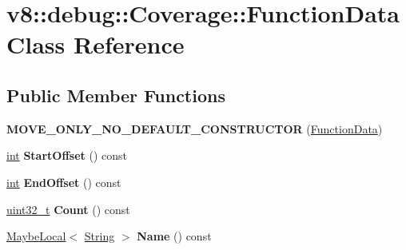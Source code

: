 \hypertarget{classv8_1_1debug_1_1Coverage_1_1FunctionData}{}\section{v8\+:\+:debug\+:\+:Coverage\+:\+:Function\+Data Class Reference}
\label{classv8_1_1debug_1_1Coverage_1_1FunctionData}
\subsection*{Public Member Functions}
\begin{DoxyCompactItemize}
\item 
\mbox{\label{classv8_1_1debug_1_1Coverage_1_1FunctionData_ac4c835da4b3f3344b9228fb4d63ea851}} 
{\bfseries M\+O\+V\+E\+\_\+\+O\+N\+L\+Y\+\_\+\+N\+O\+\_\+\+D\+E\+F\+A\+U\+L\+T\+\_\+\+C\+O\+N\+S\+T\+R\+U\+C\+T\+OR} (\mbox{\hyperlink{classv8_1_1debug_1_1Coverage_1_1FunctionData}{Function\+Data}})
\item 
\mbox{\label{classv8_1_1debug_1_1Coverage_1_1FunctionData_a05b5319ff11a68e516471e70e79b2fe4}} 
\mbox{\hyperlink{classint}{int}} {\bfseries Start\+Offset} () const
\item 
\mbox{\label{classv8_1_1debug_1_1Coverage_1_1FunctionData_a595738f91e9ad43119c0006bc49991ae}} 
\mbox{\hyperlink{classint}{int}} {\bfseries End\+Offset} () const
\item 
\mbox{\label{classv8_1_1debug_1_1Coverage_1_1FunctionData_a9b89b7702be7fed16121dacb3854f13a}} 
\mbox{\hyperlink{classuint32__t}{uint32\+\_\+t}} {\bfseries Count} () const
\item 
\mbox{\label{classv8_1_1debug_1_1Coverage_1_1FunctionData_ac91a4808f3eb6a66ff73f6bfc29e80d6}} 
\mbox{\hyperlink{classv8_1_1MaybeLocal}{Maybe\+Local}}$<$ \mbox{\hyperlink{classv8_1_1String}{String}} $>$ {\bfseries Name} () const
\item 
\mbox{\label{classv8_1_1debug_1_1Coverage_1_1FunctionData_ae060caa514cdd6dcb8636ffbad3a41e2}} 

\end{DoxyCompactItemize}
